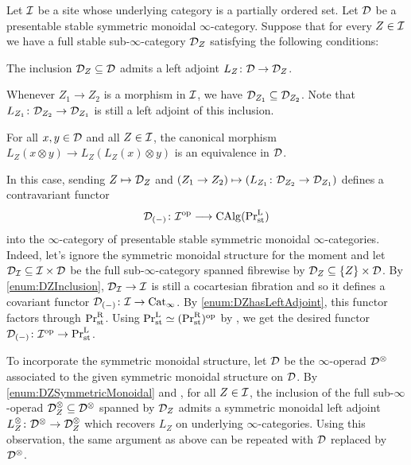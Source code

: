 \documentclass[DIV=12,numbers=enddot,leqno,bibliography=totoc]{scrartcl}
\begin{document}
	\begin{numpar}[Setup.]\label{par:GeneralDescent}
		Let $\mathcal{I}$ be a site whose underlying category is a partially ordered set. Let $\mathcal{D}$ be a presentable stable symmetric monoidal $\infty$-category. Suppose that for every $Z\in \mathcal{I}$ we have a full stable sub-$\infty$-category $\mathcal{D}_Z$ satisfying the following conditions:
		\begin{alphanumerate}
			\item The inclusion $\mathcal{D}_Z\subseteq \mathcal{D}$ admits a left adjoint $L_Z\colon \Dd\rightarrow \Dd_Z$.\label{enum:DZhasLeftAdjoint}
			\item Whenever $Z_1\rightarrow Z_2$ is a morphism in $\mathcal{I}$, we have $\mathcal{D}_{Z_1}\subseteq \mathcal{D}_{Z_2}$. Note that $L_{Z_1}\colon \Dd_{Z_2}\rightarrow \Dd_{Z_1}$ is still a left adjoint of this inclusion.\label{enum:DZInclusion}
			\item For all $x,y\in \mathcal{D}$ and all $Z\in\mathcal{I}$, the canonical morphism $L_Z(x\otimes y)\rightarrow L_Z(L_Z(x)\otimes y)$ is an equivalence in $\mathcal{D}$.\label{enum:DZSymmetricMonoidal}
		\end{alphanumerate}
		In this case, sending $Z\mapsto \mathcal{D}_Z$ and $(Z_1\rightarrow Z_2)\mapsto (L_{Z_1}\colon \Dd_{Z_2}\rightarrow \Dd_{Z_1})$ defines a contravariant functor
		\begin{equation*}
			\Dd_{(-)}\colon \Ii^\op\longrightarrow \CAlg(\Pr_\mathrm{st}^\L)
		\end{equation*}
		into the $\infty$-category of presentable stable symmetric monoidal $\infty$-categories. Indeed, let's ignore the symmetric monoidal structure for the moment and let $\mathcal{D}_{\mathcal{I}}\subseteq \mathcal{I}\times\mathcal{D}$ be the full sub-$\infty$-category spanned fibrewise by $\mathcal{D}_Z\subseteq \{Z\}\times\mathcal{D}$. By \cref{enum:DZInclusion}, $\mathcal{D}_{\mathcal{I}}\rightarrow \mathcal{I}$ is still a cocartesian fibration and so it defines a covariant functor $\Dd_{(-)}\colon \Ii\rightarrow \Cat_\infty$. By \cref{enum:DZhasLeftAdjoint}, this functor factors through $\mathrm{Pr}_\mathrm{st}^{\mathrm{R}}$. Using $\mathrm{Pr}_\mathrm{st}^{\mathrm{L}}\simeq (\mathrm{Pr}_\mathrm{st}^{\mathrm{R}})^{\mathrm{op}}$ by \cite[Corollary~]{HTT}, we get the desired functor $\Dd_{(-)}\colon \Ii^\op\rightarrow \Pr_\mathrm{st}^\L$.
		
		To incorporate the symmetric monoidal structure, let $\mathcal{D}$ be the $\infty$-operad $\mathcal{D}^\otimes$ associated to the given symmetric monoidal structure on $\mathcal{D}$. By \cref{enum:DZSymmetricMonoidal} and \cite[Proposition~]{HA}, for all $Z\in \mathcal{I}$, the inclusion of the full sub-$\infty$-operad $\mathcal{D}_Z^\otimes\subseteq \mathcal{D}^\otimes$ spanned by $\mathcal{D}_Z$ admits a symmetric monoidal left adjoint $L_Z^\otimes\colon \Dd^\otimes\rightarrow \Dd_Z^\otimes$ which recovers $L_Z$ on underlying $\infty$-categories. Using this observation, the same argument as above can be repeated with $\mathcal{D}$ replaced by $\mathcal{D}^\otimes$.
	\end{numpar}
	
\end{document}

